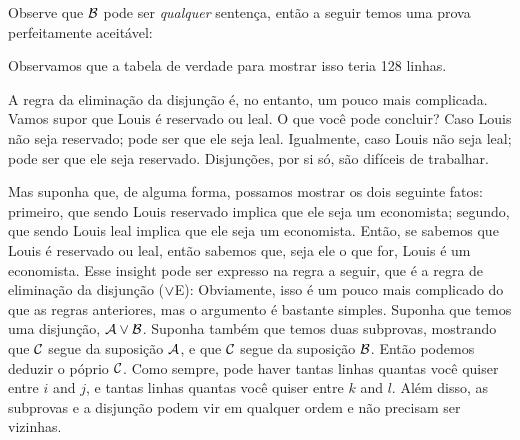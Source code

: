  

Observe que $\mathcal{B}$ pode ser \emph{qualquer} senten\c ca, ent\~ao a seguir temos uma prova perfeitamente aceit\' avel: 
\begin{fitchproof}
\end{fitchproof}


Observamos que a tabela de verdade para mostrar isso teria 128 linhas.

A regra da elimina\c c\~ao da disjun\c c\~ao \'e, no entanto, um pouco mais complicada. Vamos supor que  Louis \'e reservado ou leal.  O que voc\^e pode concluir? Caso  Louis  n\~ao seja reservado; pode ser que ele seja leal.   Igualmente, caso  Louis  n\~ao seja leal; pode ser que ele seja reservado.  Disjun\c c\~oes, por si s\'o, s\~ao dif\'iceis de trabalhar.

Mas suponha que, de alguma forma, possamos mostrar os dois seguinte fatos: primeiro, que sendo Louis reservado implica que ele seja um economista; segundo, que sendo Louis leal implica que ele seja um economista.
Ent\~ao, se sabemos que Louis \'e reservado ou leal, ent\~ao sabemos que, seja ele o que for, Louis \'e um economista.   Esse insight pode ser expresso na regra a seguir, que \'e a regra de elimina\c c\~ao da disjun\c c\~ao  ($\vee$E):
Obviamente, isso \'e um pouco mais complicado do que as regras anteriores, mas o argumento \'e bastante simples. Suponha que temos uma disjun\c c\~ao, $\mathcal{A} \vee \mathcal{B}$. Suponha tamb\'em que temos duas subprovas, mostrando que $\mathcal{C}$ segue da suposi\c c\~ao $\mathcal{A}$, e que $\mathcal{C}$ segue da suposi\c c\~ao $\mathcal{B}$. Ent\~ao podemos deduzir o p\'oprio $\mathcal{C}$. 
 Como sempre, pode haver  tantas linhas quantas  voc\^e quiser entre   $i$ and $j$,   e tantas linhas quantas voc\^e quiser entre $k$ and $l$. Al\'em disso, as subprovas e a disjun\c c\~ao podem vir em qualquer ordem e n\~ao precisam ser vizinhas.

